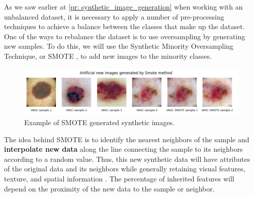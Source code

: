 As we saw earlier at \ref{pr: synthetic_image_generation} when working with an unbalanced dataset, it is necessary to apply a number of pre-processing techniques to achieve a balance between the classes that make up the dataset. One of the ways to rebalance the dataset is to use oversampling by generating new samples.  To do this, we will use the Synthetic Minority Oversampling Technique, or SMOTE \cite{smote_belharar_enhancing_2023} \cite{smote_JMLR:v18:16-365} \cite{smote_maklin_synthetic_2022}, to add new images to the minority classes. 

\begin{figure}[ht]
    \begin{center}
        \includegraphics[scale=0.6]{images/Building/SMOTE/Smote_examples.png}
        \caption{Example of SMOTE generated synthetic images.}
    \label{fig: Smote_examples}    
    \end{center}
\end{figure}

The idea behind SMOTE is to identify the nearest neighbors of the sample and \textbf{interpolate new data} along the line connecting the sample to its neighbors according to a random value. Thus, this new synthetic data will have attributes of the original data and its neighbors while generally retaining visual features, texture, and spatial information \cite{smote_belharar_enhancing_2023}. The percentage of inherited features will depend on the proximity of the new data to the sample or neighbor. 

